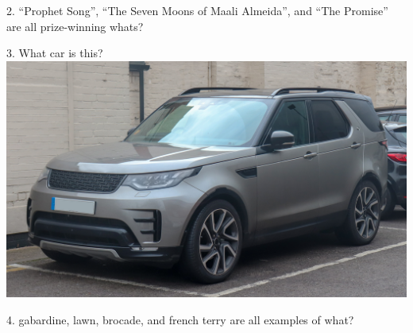 \begin{frame}
\begin{center}
\Large
2. ``Prophet Song'', ``The Seven Moons of Maali Almeida'', and ``The Promise'' are all prize-winning whats?
\\
\end{center}
\end{frame}
\begin{frame}
\begin{center}
\Large
3. What car is this?
\\
\vspace{0.5em}\includegraphics[height=0.6\paperheight]{images/land_rover_discovery.jpg}
\\
\end{center}
\end{frame}
\begin{frame}
\begin{center}
\Large
4. gabardine, lawn, brocade, and french terry are all examples of what?
\\
\\
\end{center}
\end{frame}

